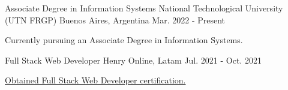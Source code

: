 

\begin{cventries}

  \cventry
    {Associate Degree in Information Systems} %
    {National Technological University (UTN FRGP)} %
    {Buenos Aires, Argentina} %
    {Mar. 2022 - Present} %
    {
      \begin{cvitems} %
        \item {Currently pursuing an Associate Degree in Information Systems.}
      \end{cvitems}
    }


  \cventry
    {Full Stack Web Developer} %
    {Henry} %
    {Online, Latam} %
    {Jul. 2021 - Oct. 2021} %
    {
      \begin{cvitems} %
        \item {\href{https://certificates.soyhenry.com/cert?id=970c6032-7d99-4536-90b3-e421ec1036d5}{Obtained Full Stack Web Developer certification.}}
      \end{cvitems}
    }

\end{cventries}
